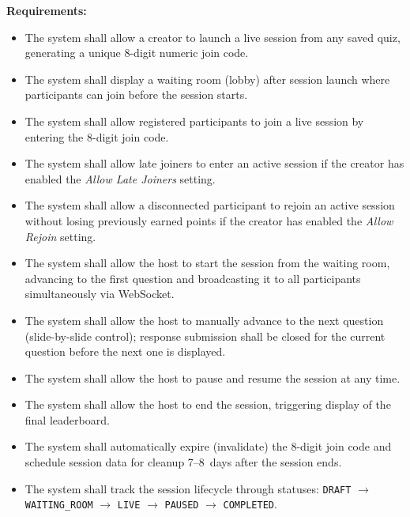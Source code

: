 \documentclass[12pt,a4paper]{article}
\begin{document}
\textbf{Requirements:}
\begin{itemize}
  \item[\textbf{FR18:}] The system shall allow a creator to launch a live session
        from any saved quiz, generating a unique 8-digit numeric join code.
  \item[\textbf{FR19:}] The system shall display a waiting room (lobby) after session
        launch where participants can join before the session starts.
  \item[\textbf{FR20:}] The system shall allow registered participants to join a live
        session by entering the 8-digit join code.
  \item[\textbf{FR21:}] The system shall allow late joiners to enter an active session
        if the creator has enabled the \emph{Allow Late Joiners} setting.
  \item[\textbf{FR22:}] The system shall allow a disconnected participant to rejoin an
        active session without losing previously earned points if the creator has
        enabled the \emph{Allow Rejoin} setting.
  \item[\textbf{FR23:}] The system shall allow the host to start the session from the
        waiting room, advancing to the first question and broadcasting it to all
        participants simultaneously via WebSocket.
  \item[\textbf{FR24:}] The system shall allow the host to manually advance to the
        next question (slide-by-slide control); response submission shall be closed
        for the current question before the next one is displayed.
  \item[\textbf{FR25:}] The system shall allow the host to pause and resume the
        session at any time.
  \item[\textbf{FR26:}] The system shall allow the host to end the session, triggering
        display of the final leaderboard.
  \item[\textbf{FR27:}] The system shall automatically expire (invalidate) the
        8-digit join code and schedule session data for cleanup 7--8~days after the
        session ends.
  \item[\textbf{FR28:}] The system shall track the session lifecycle through statuses:
        \texttt{DRAFT} $\rightarrow$ \texttt{WAITING\_ROOM} $\rightarrow$
        \texttt{LIVE} $\rightarrow$ \texttt{PAUSED} $\rightarrow$
        \texttt{COMPLETED}.
\end{itemize}

\end{document}
